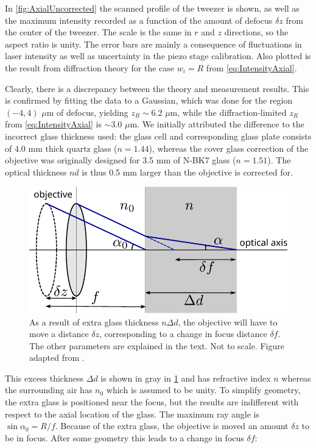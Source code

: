 In \cref{fig:AxialUncorrected} the scanned profile of the tweezer is shown, as well as the maximum intensity recorded as a function of the amount of defocus $\delta z$ from the center of the tweezer.
The scale is the same in $r$ and $z$ directions, so the aspect ratio is unity.
The error bars are mainly a consequence of fluctuations in laser intensity as well as uncertainty in the piezo stage calibration.
Also plotted is the result from diffraction theory for the case $w_i =R$ from \cref{eq:IntensityAxial}.

Clearly, there is a discrepancy between the theory and measurement results.
This is confirmed by fitting the data to a Gaussian, which was done for the region $(-4, 4)$ $\mu$m of defocus, yielding $z_R \sim 6.2$ $\mu$m, while the diffraction-limited $z_R$ from \cref{eq:IntensityAxial} is $\sim 3.0$ $\mu$m.
We initially attributed the difference to the incorrect glass thickness used: the glass cell and corresponding glass plate consists of 4.0 mm thick quartz glass ($n=1.44$), whereas the cover glass correction of the objective was originally designed for 3.5 mm of N-BK7 glass ($n=1.51$).
The optical thickness $nd$ is thus 0.5 mm larger than the objective is corrected for. 
\begin{figure}[]
    \centering
    \includegraphics[width=0.57\linewidth]{figures/sphericalAberration.pdf}
    \caption{As a result of extra glass thickness $n\Delta d$, the objective will have to move a distance $\delta z$, corresponding to a change in focus distance $\delta f$.
    The other parameters are explained in the text.  
    Not to scale. 
    Figure adapted from \cite{Iwaniuk2011}.}
    \label{fig:SphericalSketch}
\end{figure}
This excess thickness $\Delta d$ is shown in gray in \cref{fig:SphericalSketch} and has refractive index $n$ whereas the surrounding air has $n_0$ which is assumed to be unity.
To simplify geometry, the extra glass is positioned near the focus, but the results are indifferent with respect to the axial location of the glass.
The maximum ray angle is $\sin{\alpha_0} = R/f$. 
Because of the extra glass, the objective is moved an amount $\delta z$ to be in focus.
After some geometry \cite{Iwaniuk2011} this leads to a change in focus $\delta f$:

